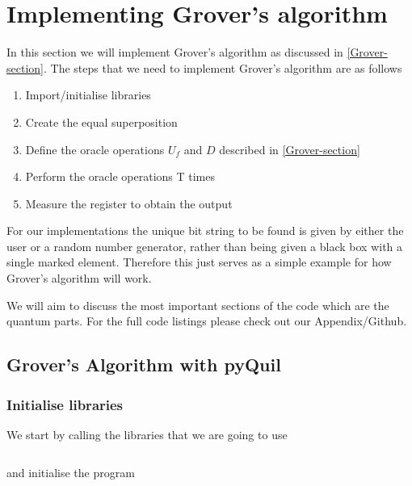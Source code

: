 \section{Implementing Grover's algorithm}

In this section we will implement Grover's algorithm as discussed in \autoref{Grover-section}. The steps that we need to implement Grover's algorithm are as follows

\begin{enumerate}
    \item{Import/initialise libraries}
    \item{Create the equal superposition}
    \item{Define the oracle operations $U_f$ and $D$ described in \autoref{Grover-section} }
    \item{Perform the oracle operations T times}
    \item{Measure the register to obtain the output}
\end{enumerate}

For our implementations the unique bit string to be found is given by either the user or a random number generator, rather than being given a black box with a single marked element. Therefore this just serves as a simple example for how Grover's algorithm will work.

We will aim to discuss the most important sections of the code which are the quantum parts. For the full code listings please check out our Appendix/Github.

\subsection{Grover's Algorithm with pyQuil}

\subsubsection{Initialise libraries}

We start by calling the libraries that we are going to use

\inputminted[lastline=5]{python}{code/pyQuil/grover_pyquil_guide.txt}

and initialise the program

\inputminted[firstnumber=18, firstline=18, lastline=20]{python}{code/pyQuil/grover_pyquil_guide.txt}

